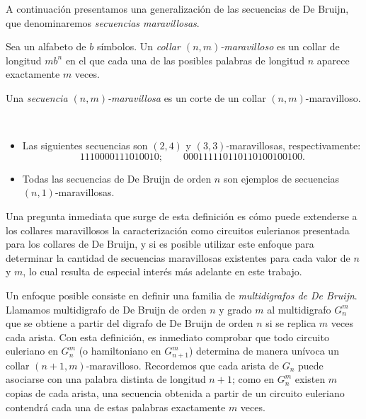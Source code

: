 A continuación presentamos una generalización de las secuencias de De Bruijn,
que denominaremos \emph{secuencias maravillosas}.

\begin{definition}
Sea un alfabeto de $b$ símbolos.
Un \emph{collar $(n,m)$-maravilloso} es un collar de longitud $mb^n$
en el que cada una de las posibles palabras de longitud $n$ aparece
exactamente $m$ veces.

Una \emph{secuencia $(n,m)$-maravillosa} es un corte de un collar
$(n,m)$-maravilloso.
\end{definition}

\begin{examples}\ %
	\begin{itemize}
		\item Las siguientes secuencias son $(2,4)$ y $(3,3)$-maravillosas, respectivamente:
		\[ 1110000111010010; \qquad 000111110110110100100100. \]
		\item Todas las secuencias de De Bruijn de orden $n$ son ejemplos de secuencias
		$(n,1)$-maravillosas.
	\end{itemize}
\end{examples}

Una pregunta inmediata que surge de esta definición es cómo puede extenderse a
los collares maravillosos la caracterización como circuitos eulerianos
presentada para los collares de De Bruijn, y si es posible utilizar este enfoque
para determinar la cantidad de secuencias maravillosas existentes para cada valor
de $n$ y $m$, lo cual resulta de especial interés más adelante en este
trabajo.

Un enfoque posible consiste en definir una familia de \emph{multidigrafos de De
	Bruijn}.
Llamamos multidigrafo de De Bruijn de orden $n$ y grado $m$ al multidigrafo
$G_n^m$ que se obtiene a partir del digrafo de De Bruijn de orden $n$ si se
replica $m$ veces cada arista.
Con esta definición, es inmediato comprobar que todo circuito euleriano en
$G_n^m$ (o hamiltoniano en $G_{n+1}^m$) determina de manera unívoca un collar
$(n+1, m)$-maravilloso.
Recordemos que cada arista de $G_n$ puede asociarse con una palabra distinta de
longitud $n+1$; como en $G_n^m$ existen $m$ copias de cada arista, una
secuencia obtenida a partir de un circuito euleriano contendrá cada una de
estas palabras exactamente $m$ veces.


